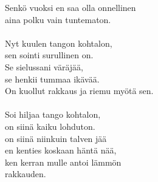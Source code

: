         Senkö vuoksi en saa olla onnellinen \\
        aina polku vain tuntematon. \\
\hspace{10mm} \\
        Nyt kuulen tangon kohtalon, \\
        sen sointi surullinen on. \\
        Se sielussani väräjää, \\
        se henkii tummaa ikävää. \\
        On kuollut rakkaus ja riemu myötä sen. \\
\hspace{10mm} \\
        Soi hiljaa tango kohtalon, \\
        on siinä kaiku lohduton. \\
        on siinä niinkuin talven jää \\
        en kenties koskaan häntä nää, \\
        ken kerran mulle antoi lämmön \\
        rakkauden. \\
